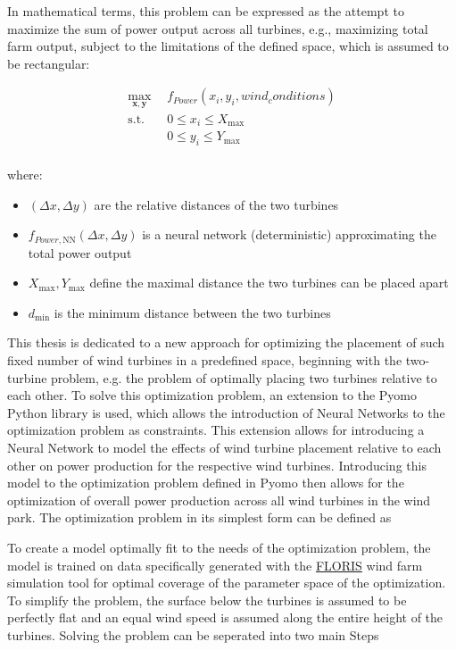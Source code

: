 In mathematical terms, this problem can be expressed as the attempt to maximize the sum of power output across all turbines, e.g., maximizing total farm output, subject to the limitations of the defined space, which is assumed to be rectangular: 

\begin{align}
	\max_{\mathbf{x}, \mathbf{y}} & f_{Power}(x_i, y_i, wind_conditions) \\
	\text{s.t.} \quad 
	&  0 \leq x_i \leq X_{\max} \\
	&  0 \leq y_i \leq Y_{\max} \\
\end{align}

where:
\begin{itemize}
	\item \( (\Delta x, \Delta y) \) are the relative distances of the two turbines
	\item \( f_{Power, \text{NN}}(\Delta x, \Delta y)\) is a neural network (deterministic) approximating the total power output
	\item \(  X_{\max}, Y_{\max} \) define the maximal distance the two turbines can be placed apart
	\item \( d_{\min} \) is the minimum distance between the two turbines
\end{itemize}


This thesis is dedicated to a new approach for optimizing the placement of such fixed number of wind turbines in a predefined space, beginning with the two-turbine problem, e.g. the problem of optimally placing two turbines relative to each other. To solve this optimization problem, an extension to the Pyomo Python library is used, which allows the introduction of Neural Networks to the optimization problem as constraints. \cite{ALCANTARA2023120895} This extension allows for introducing a Neural Network to model the effects of wind turbine placement relative to each other on power production for the respective wind turbines. Introducing this model to the optimization problem defined in Pyomo then allows for the optimization of overall power production across all wind turbines in the wind park. The optimization problem in its simplest form can be defined as


To create a model optimally fit to the needs of the optimization problem, the model is trained on data specifically generated with the \href{https://www.nrel.gov/wind/floris.html}{FLORIS} wind farm simulation tool  for optimal coverage of the parameter space of the optimization. To simplify the problem, the surface below the turbines is assumed to be perfectly flat and an equal wind speed is assumed along the entire height of the turbines. Solving the problem can be seperated into two main Steps 

